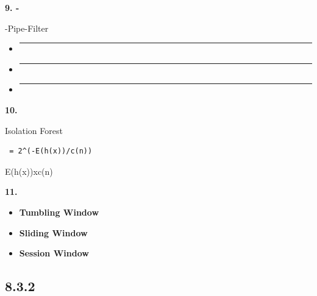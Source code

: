 \textbf{9. -}

-Pipe-Filter

\begin{itemize}
\item
  \begin{center}\rule{0.5\linewidth}{0.5pt}\end{center}
\item
  \begin{center}\rule{0.5\linewidth}{0.5pt}\end{center}
\item
  \begin{center}\rule{0.5\linewidth}{0.5pt}\end{center}
\end{itemize}

\textbf{10. }

Isolation Forest

\begin{verbatim}
 = 2^(-E(h(x))/c(n))
\end{verbatim}

E(h(x))xc(n)

\textbf{11. }

\begin{itemize}
\tightlist
\item
  \textbf{Tumbling Window}
\item
  \textbf{Sliding Window}\\
\item
  \textbf{Session Window}
\end{itemize}

\subsection{8.3.2}\label{section-40}

\subsubsection{}\label{section-41}

